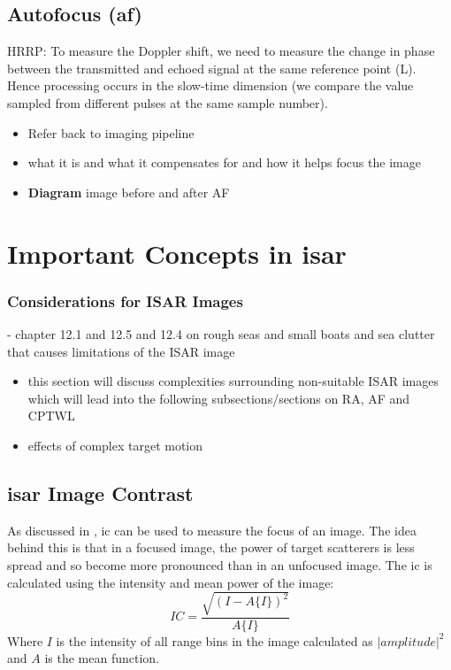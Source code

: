 \documentclass[class=report,11pt,crop=false]{standalone}
\begin{document}
    \subsection{Autofocus (\gls{af})}
    HRRP: To measure the Doppler shift, we need to measure the change in phase between the transmitted and echoed signal at the same reference point (L). Hence processing occurs in the slow-time dimension (we compare the value sampled from different pulses at the same sample number). 
    \begin{itemize}
        \item Refer back to imaging pipeline
        \item what it is and what it compensates for and how it helps focus the image
        \item \textbf{Diagram} image before and after AF
    \end{itemize}

\section{Important Concepts in \gls{isar}}

    \subsubsection{Considerations for ISAR Images}
    - chapter 12.1 and 12.5 and 12.4 on rough seas and small boats and sea clutter that causes limitations of the ISAR image
    \begin{itemize}
        \item this section will discuss complexities surrounding non-suitable ISAR images which will lead into the following subsections/sections on RA, AF and CPTWL
        \item effects of complex target motion
    \end{itemize}

    \subsection{\gls{isar} Image Contrast} %
    As discussed in \cite{image_contrast}, \gls{ic} can be used to measure the focus of an image. The idea behind this is that in a focused image, the power of target scatterers is less spread and so become more pronounced than in an unfocused image. The \gls{ic} is calculated using the intensity and mean power of the image:
    \begin{equation} \label{eq:image_contrast}
    IC = \frac{\sqrt{(I-A\{I\})^2}}{A\{I\}}
    \end{equation}
    Where \(I\) is the intensity of all range bins in the image calculated as \(|amplitude|^2\) and \(A\) is the mean function.
\end{document}
